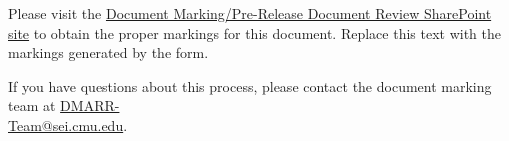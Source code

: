 Please visit the  \href{https://sharepoint.sei.cmu.edu/forms/dm/default.aspx}{Document Marking/Pre-Release Document Review SharePoint site} to obtain the proper markings for this document. Replace this text with the markings generated by the form.

If you have questions about this process, please contact the document marking team at \href{mailto:DMARR-Team@sei.cmu.edu?subject=Document\%20Marking\%20Question}{DMARR-\\Team@sei.cmu.edu}.
